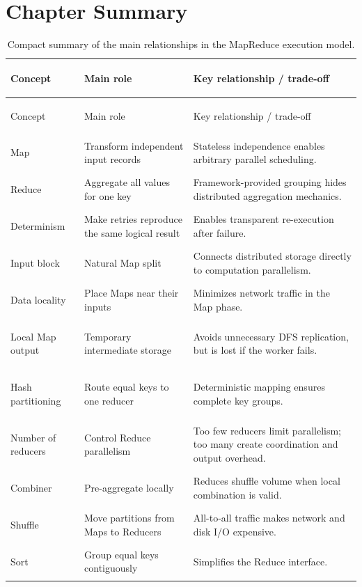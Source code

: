 \documentclass[11pt,a4paper,oneside]{book}
\begin{document}
\section{Chapter Summary}

\begin{longtable}{>{\bfseries\raggedright\arraybackslash}p{} >{\raggedright\arraybackslash}p{} >{\raggedright\arraybackslash}p{}}
\caption{Compact summary of the main relationships in the MapReduce execution model.}
\label{tab:mapreduce-core-summary}\\
\toprule
Concept & Main role & Key relationship / trade-off \\
\midrule
\endfirsthead
\toprule
Concept & Main role & Key relationship / trade-off \\
\midrule
\endhead
Map & Transform independent input records & Stateless independence enables arbitrary parallel scheduling. \\
Reduce & Aggregate all values for one key & Framework-provided grouping hides distributed aggregation mechanics. \\
Determinism & Make retries reproduce the same logical result & Enables transparent re-execution after failure. \\
Input block & Natural Map split & Connects distributed storage directly to computation parallelism. \\
Data locality & Place Maps near their inputs & Minimizes network traffic in the Map phase. \\
Local Map output & Temporary intermediate storage & Avoids unnecessary DFS replication, but is lost if the worker fails. \\
Hash partitioning & Route equal keys to one reducer & Deterministic mapping ensures complete key groups. \\
Number of reducers & Control Reduce parallelism & Too few reducers limit parallelism; too many create coordination and output overhead. \\
Combiner & Pre-aggregate locally & Reduces shuffle volume when local combination is valid. \\
Shuffle & Move partitions from Maps to Reducers & All-to-all traffic makes network and disk I/O expensive. \\
Sort & Group equal keys contiguously & Simplifies the Reduce interface. \\

\end{longtable}
\end{document}
